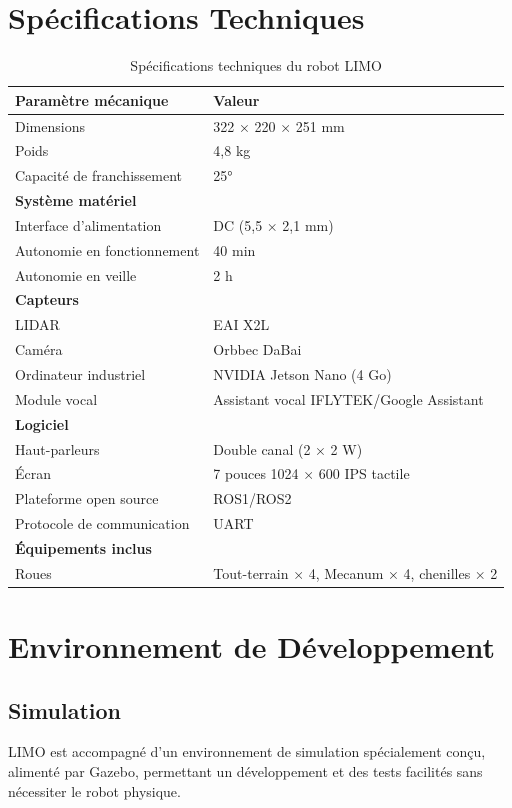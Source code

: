 \section{Spécifications Techniques}

\begin{table}[H]
\centering
\caption{Spécifications techniques du robot LIMO}
\begin{tabular}{|l|l|}
\hline
\textbf{Paramètre mécanique} & \textbf{Valeur} \\
\hline
Dimensions & 322 × 220 × 251 mm \\
\hline
Poids & 4,8 kg \\
\hline
Capacité de franchissement & 25° \\
\hline
\textbf{Système matériel} & \\
\hline
Interface d'alimentation & DC (5,5 × 2,1 mm) \\
\hline
Autonomie en fonctionnement & 40 min \\
\hline
Autonomie en veille & 2 h \\
\hline
\textbf{Capteurs} & \\
\hline
LIDAR & EAI X2L \\
\hline
Caméra & Orbbec DaBai \\
\hline
Ordinateur industriel & NVIDIA Jetson Nano (4 Go) \\
\hline
Module vocal & Assistant vocal IFLYTEK/Google Assistant \\
\hline
\textbf{Logiciel} & \\
\hline
Haut-parleurs & Double canal (2 × 2 W) \\
\hline
Écran & 7 pouces 1024 × 600 IPS tactile \\
\hline
Plateforme open source & ROS1/ROS2 \\
\hline
Protocole de communication & UART \\
\hline
\textbf{Équipements inclus} & \\
\hline
Roues & Tout-terrain × 4, Mecanum × 4, chenilles × 2 \\
\hline
\end{tabular}
\end{table}

\section{Environnement de Développement}

\subsection{Simulation}
LIMO est accompagné d'un environnement de simulation spécialement conçu, alimenté par Gazebo, permettant un développement et des tests facilités sans nécessiter le robot physique.

